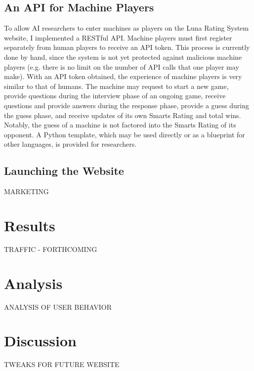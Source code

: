 \subsection{An API for Machine Players}

To allow AI researchers to enter machines as players on the Luna Rating System website, I implemented a RESTful API. Machine players must first register separately from human players to receive an API token. This process is currently done by hand, since the system is not yet protected against malicious machine players (e.g. there is no limit on the number of API calls that one player may make). With an API token obtained, the experience of machine players is very similar to that of humans. The machine may request to start a new game, provide questions during the interview phase of an ongoing game, receive questions and provide answers during the response phase, provide a guess during the guess phase, and receive updates of its own Smarts Rating and total wins. Notably, the guess of a machine is not factored into the Smarts Rating of its opponent. A Python template, which may be used directly or as a blueprint for other languages, is provided for researchers. 

\subsection{Launching the Website}

MARKETING

\section{Results}

TRAFFIC - FORTHCOMING

\section{Analysis}

ANALYSIS OF USER BEHAVIOR

\section{Discussion}

TWEAKS FOR FUTURE WEBSITE

%
%
%
%
%
%
%
%
%